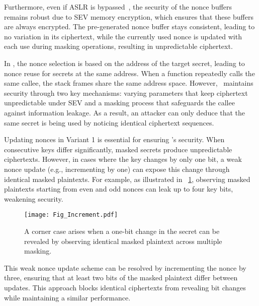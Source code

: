 Furthermore, even if ASLR is bypassed~\cite{jang2016breaking}, the security of the nonce buffers remains robust due to SEV memory encryption, which ensures that these buffers are always encrypted.
The pre-generated nonce buffer stays consistent, leading to no variation in its ciphertext, while the currently used nonce is updated with each use during masking operations, resulting in unpredictable ciphertext.

In \tool, the nonce selection is based on the address of the target secret, leading to nonce reuse for secrets at the same address. When a function repeatedly calls the same callee, the stack frames share the same address space. 
However, \tool\ maintains security through two key mechanisms: varying parameters that keep ciphertext unpredictable under SEV and a masking process that safeguards the callee against information leakage. 
As a result, an attacker can only deduce that the same secret is being used by noticing identical ciphertext sequences.

Updating nonces in Variant 1 is essential for ensuring \tool's security. 
When consecutive keys differ significantly, masked secrets produce unpredictable ciphertexts. 
However, in cases where the key changes by only one bit, a weak nonce update (e.g., incrementing by one) can expose this change through identical masked plaintexts. 
For example, as illustrated in \F~\ref{fig:increment}, observing masked plaintexts starting from even and odd nonces can leak up to four key bits, weakening security.

\begin{figure}[htbp]
\centering
\texttt{[image: Fig\_Increment.pdf]}
\caption{A corner case arises when a one-bit change in the secret can be revealed by observing identical masked plaintext across multiple masking.}
\label{fig:increment}
\end{figure}

This weak nonce update scheme can be resolved by incrementing the nonce by three, ensuring that at least two bits of the masked plaintext differ between updates. 
This approach blocks identical ciphertexts from revealing bit changes while maintaining a similar performance.
